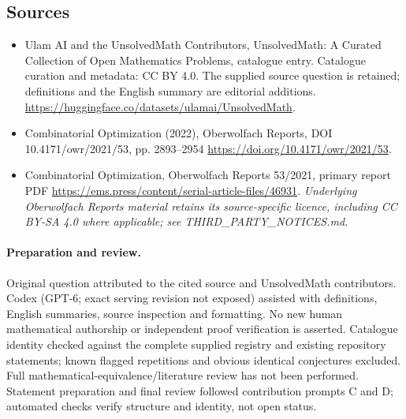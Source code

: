 \documentclass[11pt]{article}
\begin{document}
\subsection{Sources}
\begin{itemize}
\item[\hypertarget{source:statement:1}{S1}] Ulam AI and the UnsolvedMath Contributors, UnsolvedMath: A Curated Collection of Open Mathematics Problems, catalogue entry. Catalogue curation and metadata: CC BY 4.0. The supplied source question is retained; definitions and the English summary are editorial additions.
\url{https://huggingface.co/datasets/ulamai/UnsolvedMath}.
\item[\hypertarget{source:statement:2}{S2}] Combinatorial Optimization (2022), Oberwolfach Reports, DOI 10.4171/owr/2021/53, pp. 2893--2954
\url{https://doi.org/10.4171/owr/2021/53}.
\item[\hypertarget{source:statement:3}{S3}] Combinatorial Optimization, Oberwolfach Reports 53/2021, primary report PDF
\url{https://ems.press/content/serial-article-files/46931}.
\textit{Underlying Oberwolfach Reports material retains its source-specific licence, including CC BY-SA 4.0 where applicable; see THIRD\_PARTY\_NOTICES.md.}
\end{itemize}
\paragraph{Preparation and review.}
Original question attributed to the cited source and UnsolvedMath contributors. Codex (GPT-6; exact serving revision not exposed) assisted with definitions, English summaries, source inspection and formatting. No new human mathematical authorship or independent proof verification is asserted. Catalogue identity checked against the complete supplied registry and existing repository statements; known flagged repetitions and obvious identical conjectures excluded. Full mathematical-equivalence/literature review has not been performed. Statement preparation and final review followed contribution prompts C and D; automated checks verify structure and identity, not open status.
\label{end:statement}
\end{document}
